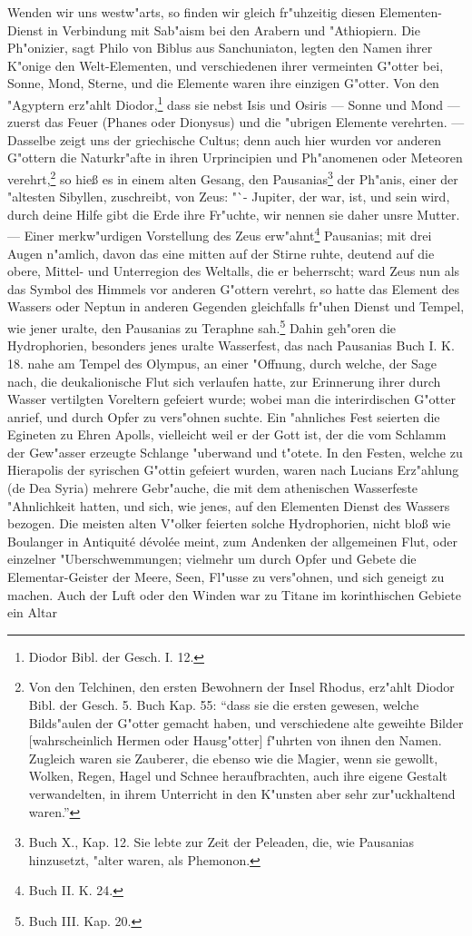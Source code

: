\documentclass[a4paper, 11pt, oneside, polutonikogreek, german]{article}
\begin{document}
Wenden wir uns westw"arts, so finden wir gleich fr"uhzeitig diesen Elementen-Dienst in Verbindung mit Sab"aism bei den Arabern und "Athiopiern. Die Ph"onizier, sagt Philo von Biblus aus Sanchuniaton, legten den Namen ihrer K"onige den Welt-Elementen, und verschiedenen ihrer vermeinten G"otter bei, Sonne, Mond, Sterne, und die Elemente waren ihre einzigen G"otter. Von den "Agyptern erz"ahlt Diodor,\footnote{Diodor Bibl. der Gesch. I. 12.} dass sie nebst Isis und Osiris --- Sonne und Mond --- zuerst das Feuer (Phanes oder Dionysus) und die "ubrigen Elemente verehrten. --- Dasselbe zeigt uns der griechische Cultus; denn auch hier wurden vor anderen G"ottern die Naturkr"afte in ihren Urprincipien und Ph"anomenen oder Meteoren verehrt,\footnote{Von den Telchinen, den ersten Bewohnern der Insel Rhodus, erz"ahlt Diodor Bibl. der Gesch. 5. Buch Kap. 55: "`dass sie die ersten gewesen, welche Bilds"aulen der G"otter gemacht haben, und verschiedene alte geweihte Bilder [wahrscheinlich Hermen oder Hausg"otter] f"uhrten von ihnen den Namen. Zugleich waren sie Zauberer, die ebenso wie die Magier, wenn sie gewollt, Wolken, Regen, Hagel und Schnee heraufbrachten, auch ihre eigene Gestalt verwandelten, in ihrem Unterricht in den K"unsten aber sehr zur"uckhaltend waren."'} so hieß es in einem alten Gesang, den Pausanias\footnote{Buch X., Kap. 12. Sie lebte zur Zeit der Peleaden, die, wie Pausanias hinzusetzt, "alter waren, als Phemonon.} der Ph"anis, einer der "altesten Sibyllen, zuschreibt, von Zeus: "`- Jupiter, der war, ist, und sein wird, durch deine Hilfe gibt die Erde ihre Fr"uchte, wir nennen sie daher unsre Mutter. --- Einer merkw"urdigen Vorstellung des Zeus erw"ahnt\footnote{Buch II. K. 24.} Pausanias; mit drei Augen n"amlich, davon das eine mitten auf der Stirne ruhte, deutend auf die obere, Mittel- und Unterregion des Weltalls, die er beherrscht; ward Zeus nun als das Symbol des Himmels vor anderen G"ottern verehrt, so hatte das Element des Wassers oder Neptun in anderen Gegenden gleichfalls fr"uhen Dienst und Tempel, wie jener uralte, den Pausanias zu Teraphne sah.\footnote{Buch III. Kap. 20.} Dahin geh"oren die Hydrophorien, besonders jenes uralte Wasserfest, das nach Pausanias Buch I. K. 18. nahe am Tempel des Olympus, an einer "Offnung, durch welche, der Sage nach, die deukalionische Flut sich verlaufen hatte, zur Erinnerung ihrer durch Wasser vertilgten Voreltern gefeiert wurde; wobei man die interirdischen G"otter anrief, und durch Opfer zu vers"ohnen suchte. Ein "ahnliches Fest seierten die Egineten zu Ehren Apolls, vielleicht weil er der Gott ist, der die vom Schlamm der Gew"asser erzeugte Schlange "uberwand und t"otete. In den Festen, welche zu Hierapolis der syrischen G"ottin gefeiert wurden, waren nach Lucians Erz"ahlung (de Dea Syria) mehrere Gebr"auche, die mit dem athenischen Wasserfeste "Ahnlichkeit hatten, und sich, wie jenes, auf den Elementen Dienst des Wassers bezogen. Die meisten alten V"olker feierten solche Hydrophorien, nicht bloß wie Boulanger in Antiquité dévolée meint, zum Andenken der allgemeinen Flut, oder einzelner "Uberschwemmungen; vielmehr um durch Opfer und Gebete die Elementar-Geister der Meere, Seen, Fl"usse zu vers"ohnen, und sich geneigt zu machen. Auch der Luft oder den Winden war zu Titane im korinthischen Gebiete ein Altar 
\end{document}
